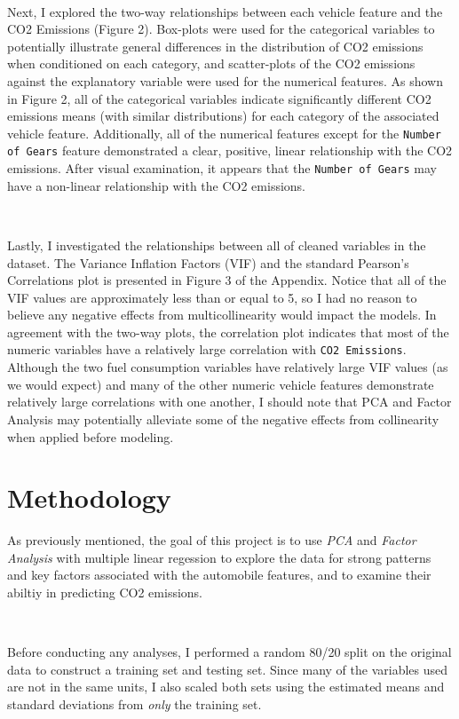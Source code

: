 \documentclass[11pt]{article}
\begin{document}
\

Next, I explored the two-way relationships between each vehicle feature and the CO2 Emissions (Figure 2). Box-plots were used for the categorical variables to potentially illustrate general differences in the distribution of CO2 emissions when conditioned on each category, and scatter-plots of the CO2 emissions against the explanatory variable were used for the numerical features. As shown in Figure 2, all of the categorical variables indicate significantly different CO2 emissions means (with similar distributions) for each category of the associated vehicle feature. Additionally, all of the numerical features except for the \texttt{Number of Gears} feature demonstrated a clear, positive, linear relationship with the CO2 emissions. After visual examination, it appears that the \texttt{Number of Gears} may have a non-linear relationship with the CO2 emissions.

\

Lastly, I investigated the relationships between all of cleaned variables in the dataset. The Variance Inflation Factors (VIF) and the standard Pearson's Correlations plot is presented in Figure 3 of the Appendix. Notice that all of the VIF values are approximately less than or equal to 5, so I had no reason to believe any negative effects from multicollinearity would impact the models. In agreement with the two-way plots, the correlation plot indicates that most of the numeric variables have a relatively large correlation with \texttt{CO2 Emissions}. Although the two fuel consumption variables have relatively large VIF values (as we would expect) and many of the other numeric vehicle features demonstrate relatively large correlations with one another, I should note that PCA and Factor Analysis may potentially alleviate some of the negative effects from collinearity when applied before modeling.


\section*{Methodology}

As previously mentioned, the goal of this project is to use \textit{PCA} and \textit{Factor Analysis} with multiple linear regession to explore the data for strong patterns and key factors associated with the automobile features, and to examine their abiltiy in predicting CO2 emissions. 

\

Before conducting any analyses, I performed a random 80/20 split on the original data to construct a training set and testing set. Since many of the variables used are not in the same units, I also scaled both sets using the estimated means and standard deviations from \textit{only} the training set.
\end{document}
